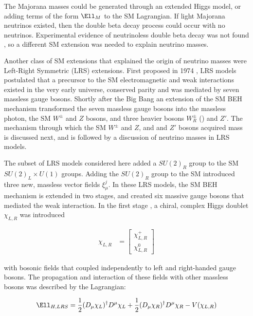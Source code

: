 The Majorana masses could be generated through an extended Higgs model, or adding terms of the form $\Ell_{M}$ 
to the SM Lagrangian.  If light Majorana neutrinos existed, then the double beta decay process could occur 
with no neutrinos.  Experimental evidence of neutrinoless double beta decay was not found 
\cite{igexDblBetaDecay,gerdaDblBetaDecay}, so a different SM extension was needed to explain neutrino masses.

Another class of SM extensions that explained the origin of neutrino masses were Left-Right Symmetric (LRS) extensions.  
First proposed in 1974 \cite{earlyLRSModel}, LRS models postulated that a precursor to the SM electromagnetic and weak interactions 
existed in the very early universe, conserved parity and was mediated by seven massless gauge bosons.  
Shortly after the Big Bang an extension of the SM BEH mechanism transformed the seven massless gauge bosons 
into the massless photon, the SM $W^{\pm}$ and $Z$ bosons, and three heavier bosons $W^{\pm}_{R}$ (\WR) and $Z'$.  
The mechanism through which the SM $W^{\pm}$ and $Z$, and \WR and $Z'$ bosons acquired mass is discussed next, and 
is followed by a discussion of neutrino masses in LRS models.

The subset of LRS models considered here added a $SU(2)_{R}$ group to the SM $SU(2)_{L} \times U(1)$ groups.
Adding the $SU(2)_{R}$ group to the SM introduced three new, massless vector fields $\xi^{j}_{\mu}$.  In these LRS models, 
the SM BEH mechanism is extended in two stages, and created six massive gauge bosons that mediated the weak interaction.  
In the first stage \cite{lrsHiggsStageOne}, a chiral, complex Higgs doublet $\chi_{L,R}$ was introduced 

\begin{align}
	\chi_{L,R} &= \begin{bmatrix}
	\chi^{+}_{L,R} \\
	\chi^{0}_{L,R}
	\end{bmatrix}
	\label{eq:stageOneVEV}
\end{align}

with bosonic fields that coupled independently to left and right-handed gauge bosons.  The propagation and interaction of these 
fields with other massless bosons was described by the Lagrangian:

\begin{equation}
	\Ell_{H,LRS} = \frac{1}{2}(D_{\mu}\chi_{L})^{\dagger}D^{\mu}\chi_{L} + \frac{1}{2}(D_{\mu}\chi_{R})^{\dagger}D^{\mu}\chi_{R} - V(\chi_{L,R})
\end{equation}

